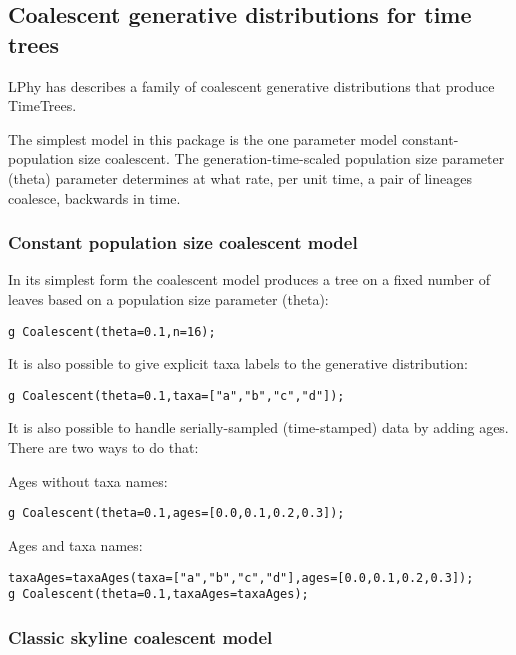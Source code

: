\documentclass[10pt,letterpaper,table]{article}
\begin{document}
{\subsection*{Coalescent generative distributions for time trees}

LPhy has describes a family of coalescent generative distributions
that produce TimeTrees.

The simplest model in this package is the one parameter model
constant-population size coalescent.
The generation-time-scaled population size parameter (theta) parameter determines at
what rate, per unit time, a pair of lineages coalesce, backwards in time.

\subsubsection*{Constant population size coalescent model}

In its simplest form \cite{kingman81} the coalescent model produces a
tree on a fixed number of leaves based on a population size parameter (theta):

\begin{alltt}
  g ~ Coalescent(theta=0.1, n=16);
\end{alltt}

It is also possible to give explicit taxa labels to the generative
distribution:

\begin{alltt}
  g ~ Coalescent(theta=0.1, taxa=["a", "b", "c", "d"]);
\end{alltt}

It is also possible to handle serially-sampled (time-stamped) data by
adding ages.
There are two ways to do that:

Ages without taxa names:

\begin{alltt}
  g ~ Coalescent(theta=0.1, ages=[0.0, 0.1, 0.2, 0.3]);
\end{alltt}

Ages and taxa names:

\begin{alltt}
  taxaAges = taxaAges(taxa=["a", "b", "c", "d"], ages=[0.0, 0.1, 0.2, 0.3]);
  g ~ Coalescent(theta=0.1, taxaAges=taxaAges);
\end{alltt}

\subsubsection*{Classic skyline coalescent model}

}
\end{document}
